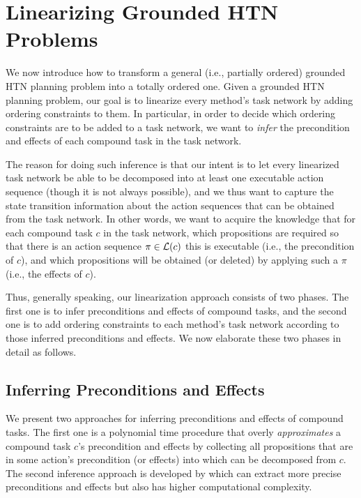 \section{Linearizing Grounded HTN Problems}

We now introduce how to transform a general (i.e., partially ordered) grounded HTN planning problem into a totally ordered one. Given a grounded HTN planning problem, our goal is to linearize every method's task network by adding ordering constraints to them. In particular, in order to decide which ordering constraints are to be added to a task network, we want to \emph{infer} the precondition and effects of each compound task in the task network. %

The reason for doing such inference is that our intent is to let every linearized task network be able to be decomposed into at least one executable action sequence (though it is not always possible), and we thus want to capture the state transition information about the action sequences that can be obtained from the task network. In other words, we want to acquire the knowledge that for each compound task $c$ in the task network, which propositions are required so that there is an action sequence $\pi \in \mathcal{L}(c)$ this is executable (i.e., the precondition of $c$), and which propositions will be obtained (or deleted) by applying such a $\pi$ (i.e., the effects of $c$). %

Thus, generally speaking, our linearization approach consists of two phases. The first one is to infer preconditions and effects of compound tasks, and the second one is to add ordering constraints to each method's task network according to those inferred preconditions and effects. We now elaborate these two phases in detail as follows.

\subsection{Inferring Preconditions and Effects}
We present two approaches for inferring preconditions and effects of compound tasks. The first one is a polynomial time procedure that overly \emph{approximates} a compound task $c$'s precondition and effects by collecting all propositions that are in some action's precondition (or effects) into which can be decomposed from $c$. The second inference approach is developed by  which can extract more precise preconditions and effects but also has higher computational complexity. 

